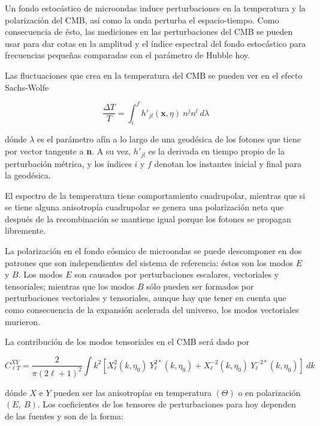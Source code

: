 Un fondo estocástico de microondas induce perturbaciones en la temperatura y la polarización del CMB, así como la onda perturba el espacio-tiempo. Como consecuencia de ésto, las mediciones en las perturbaciones del CMB se pueden usar para dar cotas en la amplitud y el índice espectral del fondo estocástico para frecuencias pequeñas comparadas con el parámetro de Hubble hoy.

Las fluctuaciones que crea en la temperatura del CMB se pueden ver en el efecto Sachs-Wolfe

\begin{equation}
    \frac{\Delta T}{T} = \int_i^f h'_{jl} \left( \textbf{x}, \eta \right) \ n^j n^l \ d\lambda
\end{equation}

\noindent
dónde $\lambda$ es el parámetro afín a lo largo de una geodésica de los fotones que tiene por vector tangente a \textbf{n}. A su vez, $h'_{jl}$ es la derivada en tiempo propio de la perturbación métrica, y los índices $i$ y $f$ denotan los instantes inicial y final para la geodésica. 

El espectro de la temperatura tiene comportamiento cuadrupolar, mientras que si se tiene alguna anisotropía cuadrupolar se genera una polarización neta que después de la recombinación se mantiene igual porque los fotones se propagan libremente.

La polarización en el fondo cósmico de microondas se puede descomponer en dos patrones que son independientes del sistema de referencia: éstos son los modos $E$ y $B$. Los modos $E$ son causados por perturbaciones escalares, vectoriales y tensoriales; mientras que los modos $B$ sólo pueden ser formados por perturbaciones vectoriales y tensoriales, aunque hay que tener en cuenta que como consecuencia de la expansión acelerada del universo, los modos vectoriales murieron.

La contribución de los modos tensoriales en el CMB será dado por

\begin{equation}
    C_{\ell T}^{X Y} = \frac{2}{\pi (2\ell + 1)^2} \int k^2 \left[ X_\ell^2 (k, \eta_0) \ Y^{2*}_\ell (k, \eta_0) + X^{-2}_\ell (k,\eta_0) \ Y^{-2*}_\ell (k, \eta_0) \right] \ dk
\end{equation}

\noindent
dónde $X$ e $Y$ pueden ser las anisotropías en temperatura $(\Theta)$ o en polarización $(E, \ B)$. Los coeficientes de los tensores de perturbaciones para hoy dependen de las fuentes y son de la forma:

